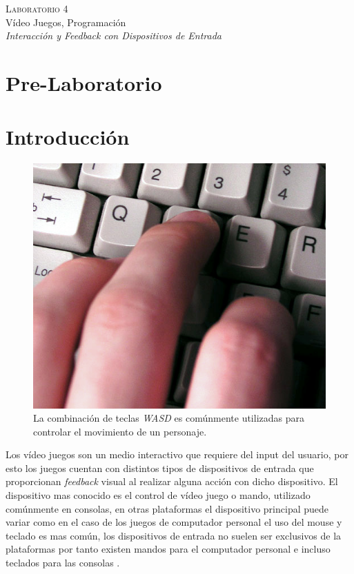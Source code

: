 \begin{center}
\textsc{\Large Laboratorio 4}~\\
{\large Vídeo Juegos, Programación}~\\
\emph{Interacción y \emph{Feedback} con Dispositivos de Entrada}
\end{center}

\section{Pre-Laboratorio}

\section{Introducción}
\setlength\intextsep{0pt}
\begin{figure}
\includegraphics[width=\linewidth]{semana4/wasd.jpg}
\caption{La combinación de teclas \emph{WASD} es comúnmente utilizadas para controlar el movimiento de un personaje.}
\label{fig:wasd}
\end{figure}
Los vídeo juegos son un medio interactivo que requiere del input del usuario, por esto los juegos cuentan con distintos tipos de dispositivos de entrada que proporcionan \emph{feedback} visual al realizar alguna acción con dicho dispositivo. El dispositivo mas conocido es el control de vídeo juego o mando, utilizado comúnmente en consolas, en otras plataformas el dispositivo principal puede variar como en el caso de los juegos de computador personal el uso del mouse y teclado es mas común, los dispositivos de entrada no suelen ser exclusivos de la plataformas por tanto existen mandos para el computador personal e incluso teclados para las consolas \cite[p.~395]{jenkinscreatinggames}.
